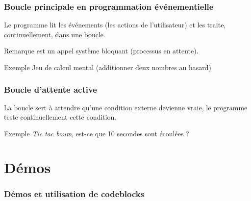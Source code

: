 \documentclass[xcolor=pdftex,svgnames,table]{beamer}
\begin{document}
\begin{frame}[fragile]
\frametitle{Boucle principale en programmation événementielle}

Le programme lit les événements
(les actions de l'utilisateur) et les traite, continuellement, dans
une boucle.

\begin{block}{Remarque}
  est un \alert{appel système bloquant} (processus en attente).
\end{block}
\begin{block}{Exemple}
Jeu de calcul mental (additionner deux nombres au hasard)\nowrite
\end{block}



\end{frame}

\begin{frame}[fragile]
  \frametitle{Boucle d'attente active}
La boucle sert à attendre qu'une condition externe devienne vraie, le
programme teste continuellement cette condition. 
\pause
\begin{block}{Exemple}
  \emph{Tic tac boum}, est-ce que 10 secondes sont écoulées ?\nowrite
\end{block}


\end{frame}

\section{Démos}
\begin{frame}
  \frametitle{Démos et utilisation de codeblocks}
\end{frame}
\end{document}
